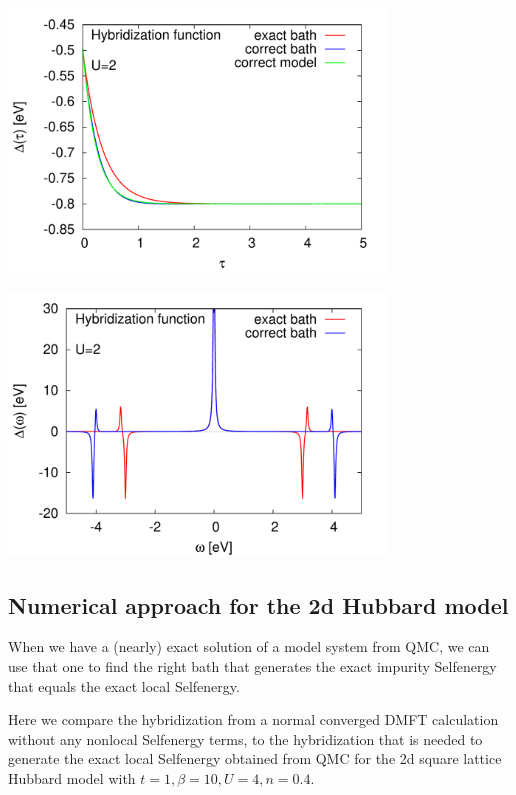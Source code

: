 \documentclass[12pt,a4paper]{scrartcl}
\numberwithin{equation}{section}
\begin{document}
\includegraphics[width=0.75\textwidth]{figs/reversebath/dimerbath/hyb_exact_t.pdf}

\includegraphics[width=0.75\textwidth]{figs/reversebath/dimerbath/hyb_exact_w.pdf}




\subsection{Numerical approach for the 2d Hubbard model}
When we have a (nearly) exact solution of a model system  from QMC,
we can use that one to find the right bath that generates the exact
impurity Selfenergy that equals the exact local Selfenergy.

Here we compare the hybridization from a normal converged DMFT calculation without
any nonlocal Selfenergy terms, to the hybridization that is needed
to generate the exact local Selfenergy obtained from QMC for the 2d square lattice Hubbard model
with $t=1, \beta=10, U=4, n=0.4$.
\end{document}
